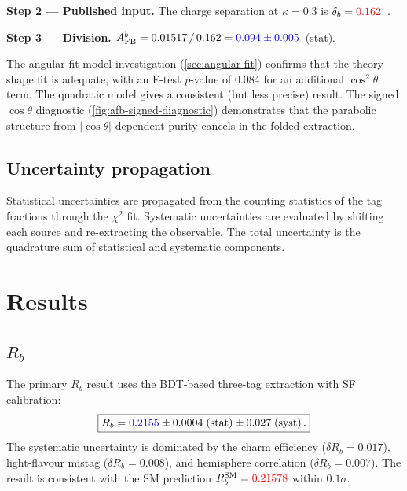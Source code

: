 \documentclass[11pt,a4paper]{article}
\newcommand{\measured}[1]{\textcolor{blue}{#1}}
\newcommand{\external}[1]{\textcolor{red}{#1}}
\begin{document}
\textbf{Step 2 --- Published input.}
The charge separation at $\kappa = 0.3$ is
$\delta_b = \external{0.162}$~\cite{ALEPH:AFBb,LEP:EWWG:2005}.

\textbf{Step 3 --- Division.}
$A_\mathrm{FB}^b = 0.01517\,/\,0.162 = \measured{0.094 \pm 0.005}$~(stat).

The angular fit model investigation (\cref{sec:angular-fit}) confirms
that the theory-shape fit is adequate, with an F-test $p$-value of 0.084
for an additional $\cos^2\theta$ term.  The quadratic model gives a
consistent (but less precise) result.  The signed $\cos\theta$ diagnostic
(\cref{fig:afb-signed-diagnostic}) demonstrates that the parabolic
structure from $|\cos\theta|$-dependent purity cancels in the folded
extraction.

\subsection{Uncertainty propagation}

Statistical uncertainties are propagated from the counting statistics of
the tag fractions through the $\chi^2$ fit.  Systematic uncertainties are
evaluated by shifting each source and re-extracting the observable.  The
total uncertainty is the quadrature sum of statistical and systematic
components.

\section{Results}
\label{sec:results}

\subsection{$R_b$}

The primary $R_b$ result uses the BDT-based three-tag extraction with
SF calibration:
\begin{equation}
\boxed{
  R_b = \measured{0.2155} \pm 0.0004\;\mathrm{(stat)} \pm
  0.027\;\mathrm{(syst)}\,.
}
\label{eq:rb-result}
\end{equation}
The systematic uncertainty is dominated by the charm efficiency
($\delta R_b = 0.017$), light-flavour mistag ($\delta R_b = 0.008$),
and hemisphere correlation ($\delta R_b = 0.007$).  The result is
consistent with the SM prediction $R_b^\mathrm{SM} = \external{0.21578}$
within $0.1\sigma$.
\end{document}
